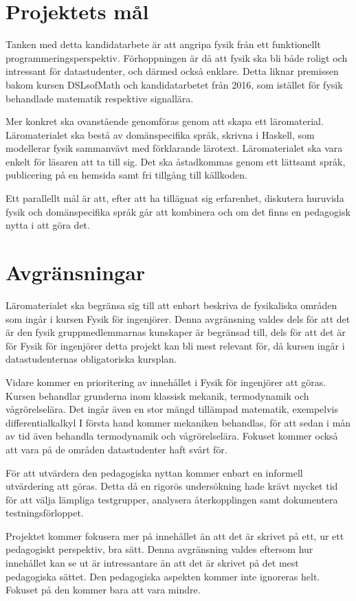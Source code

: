 \section{Projektets mål}

Tanken med detta kandidatarbete är att angripa fysik från ett funktionellt
programmeringsperspektiv. Förhoppningen är då att fysik ska bli både
roligt och intressant för datastudenter, och därmed också
enklare. Detta liknar premissen bakom kursen DSLsofMath och kandidatarbetet
från 2016, som istället för fysik behandlade matematik respektive signallära.

Mer konkret ska ovanstående genomföras genom att skapa ett läromaterial.
Läromaterialet ska bestå av 
domänspecifika språk, skrivna
i Haskell, som
modellerar fysik sammanvävt med förklarande lärotext. Läromaterialet ska vara
enkelt för läsaren att ta till sig. Det ska åstadkommas genom ett lättsamt
språk, publicering på en hemsida samt fri tillgång till källkoden.

Ett parallellt mål är att, efter att ha tillägnat sig erfarenhet, diskutera
huruvida fysik och domänspecifika språk går att kombinera och om det finns en
pedagogisk nytta i att göra det.

\section{Avgränsningar}\label{sec:avgransningar}

Läromaterialet ska begränsa sig till att enbart beskriva de fysikaliska områden
som ingår i kursen Fysik för ingenjörer. Denna avgränsning valdes dels för att
det är den fysik gruppmedlemmarnas kunskaper är begränsad till, dels för att
det är för Fysik för ingenjörer detta projekt kan bli mest relevant för, då
kursen ingår i datastudenternas obligatoriska kursplan.

Vidare kommer en prioritering av innehållet i Fysik för ingenjörer att göras.
Kursen behandlar grunderna inom klassisk mekanik, termodynamik och
vågrörelselära. Det ingår även en stor mängd tillämpad matematik, exempelvis
differentialkalkyl I första hand kommer mekaniken behandlas, för att sedan i mån
av tid även behandla termodynamik och vågrörelselära. Fokuset kommer också att
vara på de områden datastudenter haft svårt för.

För att utvärdera den pedagogiska nyttan kommer enbart en informell utvärdering
att göras. Detta då en rigorös undersökning hade krävt mycket tid för att välja
lämpliga testgrupper, analysera återkopplingen samt dokumentera
testningsförloppet.

Projektet kommer fokusera mer på innehållet än att det är skrivet på ett, ur
ett pedagogiskt perspektiv, bra sätt. Denna avgränsning valdes eftersom hur
innehållet kan se ut är intressantare än att det är skrivet på det mest
pedagogiska sättet. Den pedagogiska aspekten kommer inte ignoreras helt. Fokuset
på den kommer bara att vara mindre.
